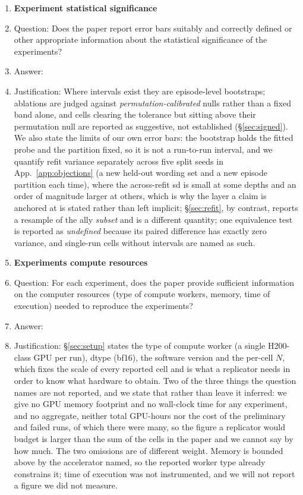 \begin{enumerate}
\item {\bf Experiment statistical significance}
    \item[] Question: Does the paper report error bars suitably and correctly defined or other appropriate information about the statistical significance of the experiments?
    \item[] Answer: \answerYes{}
    \item[] Justification: Where intervals exist they are episode-level bootstraps; ablations are judged against \emph{permutation-calibrated} nulls rather than a fixed band alone, and cells clearing the tolerance but sitting above their permutation null are reported as suggestive, not established (\S\ref{sec:signed}). We also state the limits of our own error bars: the bootstrap holds the fitted probe and the partition fixed, so it is not a run-to-run interval, and we quantify refit variance separately across five split seeds in App.~\ref{app:objections} (a new held-out wording set and a new episode partition each time), where the across-refit sd is small at some depths and an order of magnitude larger at others, which is why the layer a claim is anchored at is stated rather than left implicit; \S\ref{sec:refit}, by contrast, reports a resample of the ally \emph{subset} and is a different quantity; one equivalence test is reported as \emph{undefined} because its paired difference has exactly zero variance, and single-run cells without intervals are named as such.
\item {\bf Experiments compute resources}
    \item[] Question: For each experiment, does the paper provide sufficient information on the computer resources (type of compute workers, memory, time of execution) needed to reproduce the experiments?
    \item[] Answer: \answerYes{}
    \item[] Justification: \S\ref{sec:setup} states the type of compute worker (a single H200-class GPU per run), dtype (bf16), the software version and the per-cell $N$, which fixes the scale of every reported cell and is what a replicator needs in order to know what hardware to obtain. Two of the three things the question names are not reported, and we state that rather than leave it inferred: we give no GPU memory footprint and no wall-clock time for any experiment, and no aggregate, neither total GPU-hours nor the cost of the preliminary and failed runs, of which there were many, so the figure a replicator would budget is larger than the sum of the cells in the paper and we cannot say by how much. The two omissions are of different weight. Memory is bounded above by the accelerator named, so the reported worker type already constrains it; time of execution was not instrumented, and we will not report a figure we did not measure.

\end{enumerate}
